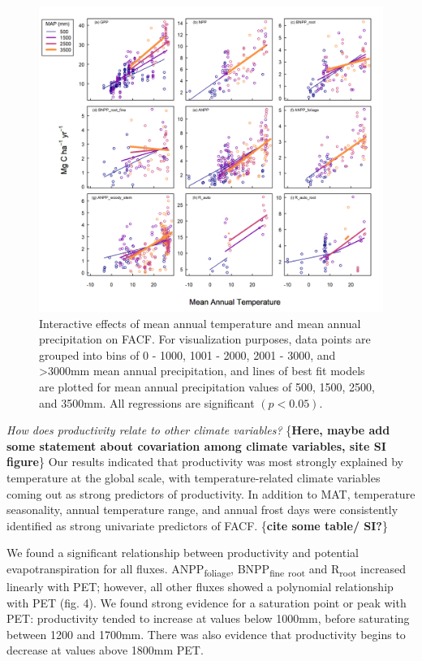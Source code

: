 \documentclass[]{article}
\begin{document}
\begin{figure}[H]
\includegraphics[width=1\linewidth]{mat_map_interaction} \caption{Interactive effects of mean annual temperature and mean annual precipitation on FACF. For visualization purposes, data points are grouped into bins of 0 - 1000, 1001 - 2000, 2001 - 3000, and >3000mm mean annual precipitation, and lines of best fit models are plotted for mean annual precipitation values of 500, 1500, 2500, and 3500mm. All regressions are significant $(p<0.05)$.}\label{fig:unnamed-chunk-7}
\end{figure}

\emph{How does productivity relate to other climate variables?}
\{\textbf{Here, maybe add some statement about covariation among climate
variables, site SI figure}\} Our results indicated that productivity was
most strongly explained by temperature at the global scale, with
temperature-related climate variables coming out as strong predictors of
productivity. In addition to MAT, temperature seasonality, annual
temperature range, and annual frost days were consistently identified as
strong univariate predictors of FACF. \{\textbf{cite some table/ SI?}\}

We found a significant relationship between productivity and potential
evapotranspiration for all fluxes. ANPP\textsubscript{foliage},
BNPP\textsubscript{fine} \textsubscript{root} and R\textsubscript{root}
increased linearly with PET; however, all other fluxes showed a
polynomial relationship with PET (fig. 4). We found strong evidence for
a saturation point or peak with PET: productivity tended to increase at
values below 1000mm, before saturating between 1200 and 1700mm. There
was also evidence that productivity begins to decrease at values above
1800mm PET.
\end{document}
